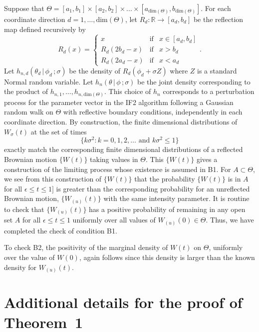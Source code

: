 \documentclass[11pt]{article}
\newcommand{\bbTheta}{\Theta}
\def\R{\mathbb{R}}
\newcommand\Thetaspace{{\bbTheta}}
\newcommand\Thetadim{{\mathrm{dim}}(\Thetaspace)}
\newcommand\given{{\, | \,}}
\newcommand\giventh{\,;}
\begin{document}
Suppose that $\Theta=[a_1,b_1]\times[a_2,b_2]\times...\times[a_{\Thetadim},b_{\Thetadim}]$. 
For each coordinate direction $d=1,\dots,\Thetadim$, let $R_d:\R\to[a_d,b_d]$ be the reflection map defined recursively by
\begin{equation*}
R_d(x)= \left\{
\begin{array}{lcl}
x &\mbox{if}& x\in[a_d,b_d]\\
R_d(2b_d-x)&\mbox{if}& x>b_d\\
R_d(2a_d-x)&\mbox{if}& x<a_d
\end{array}\right. .
\end{equation*}
Let $h_{n,d}(\theta_d\given \phi_d\giventh\sigma)$ be the density of
$R_d(\phi_d+\sigma Z)$ where $Z$ is a standard Normal random variable.
Let $h_n(\theta\given \phi\giventh\sigma)$ be the joint density corresponding to the product of $h_{n,1},\dots,h_{n,\Thetadim}$.
This choice of $h_n$ corresponds to a perturbation process for the parameter vector in the IF2 algorithm following a Gaussian random walk on $\Theta$ with reflective boundary conditions, independently in each coordinate direction. 
By construction, the finite dimensional distributions of $W_\sigma(t)$ at the set of times 
\begin{equation}\nonumber
\{k\sigma^2:k=0,1,2,\dots \mbox{ and } k\sigma^2\le 1\}
\end{equation}
 exactly match the corresponding finite dimensional distributions of a reflected Brownian motion $\{W(t)\}$ taking values in $\Theta$.
This $\{W(t)\}$ gives a construction of the limiting process whose existence is assumed in B1.
For $A\subset\Theta$, we see from this construction of $\{W(t)\}$ that the probability  $\{W(t)\}$ is in $A$ for all $\epsilon\le t\le 1]$ is greater than the corresponding probability for an unreflected Brownian motion, $\{W_{(u)}(t)\}$ with the same intensity parameter.
It is routine to check that $\{W_{(u)}(t)\}$ has a positive probability of remaining in any open set $A$ for all $\epsilon\le t\le 1$ uniformly over all values of $W_{(u)}(0)\in \Theta$.
Thus, we have completed the check of condition B1. 

To check B2,
the positivity of the marginal density of $W(t)$ on $\Theta$, uniformly over the value of $W(0)$, again follows since this density is larger than the known density for $W_{(u)}(t)$.


\section{Additional details for the proof of Theorem~1}
\end{document}
